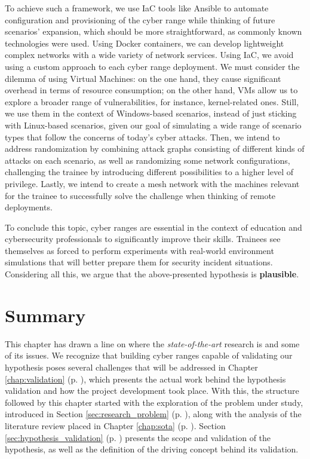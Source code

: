 To achieve such a framework, we use IaC tools like Ansible to automate configuration and provisioning of the cyber range while thinking of future scenarios' expansion, which should be more straightforward, as commonly known technologies were used. Using Docker containers, we can develop lightweight complex networks with a wide variety of network services. Using IaC, we avoid using a custom approach to each cyber range deployment. We must consider the dilemma of using Virtual Machines: on the one hand, they cause significant overhead in terms of resource consumption; on the other hand, VMs allow us to explore a broader range of vulnerabilities, for instance, kernel-related ones. Still, we use them in the context of Windows-based scenarios, instead of just sticking with Linux-based scenarios, given our goal of simulating a wide range of scenario types that follow the concerns of today's cyber attacks. Then, we intend to address randomization by combining attack graphs consisting of different kinds of attacks on each scenario, as well as randomizing some network configurations, challenging the trainee by introducing different possibilities to a higher level of privilege. Lastly, we intend to create a mesh network with the machines relevant for the trainee to successfully solve the challenge when thinking of remote deployments.

To conclude this topic, cyber ranges are essential in the context of education and cybersecurity professionals to significantly improve their skills. Trainees see themselves as forced to perform experiments with real-world environment simulations that will better prepare them for security incident situations. Considering all this, we argue that the above-presented hypothesis is \textbf{plausible}.

\section{Summary} \label{sec:problem_summary}

This chapter has drawn a line on where the \textit{state-of-the-art} research is and some of its issues. We recognize that building cyber ranges capable of validating our hypothesis poses several challenges that will be addressed in Chapter \ref{chap:validation} (p. \pageref{chap:validation}), which presents the actual work behind the hypothesis validation and how the project development took place. With this, the structure followed by this chapter started with the exploration of the problem under study, introduced in Section \ref{sec:research_problem} (p. \pageref{sec:research_problem}), along with the analysis of the literature review placed in Chapter \ref{chap:sota} (p. \pageref{chap:sota}). Section \ref{sec:hypothesis_validation} (p. \pageref{sec:hypothesis_validation}) presents the scope and validation of the hypothesis, as well as the definition of the driving concept behind its validation.